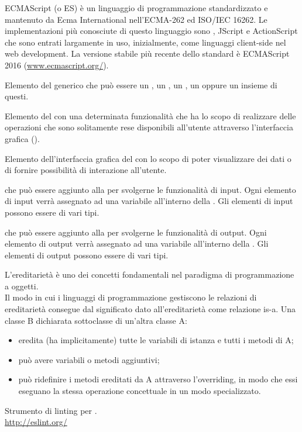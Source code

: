 ECMAScript (o ES) è un linguaggio di programmazione standardizzato e mantenuto da Ecma International nell'ECMA-262 ed ISO/IEC 16262. Le implementazioni più conosciute di questo linguaggio sono , JScript e ActionScript che sono entrati largamente in uso, inizialmente, come linguaggi client-side nel web development.
La versione stabile più recente dello standard è ECMAScript 2016 (\url{www.ecmascript.org/}).

Elemento del  generico che può essere un , un , un , un  oppure un insieme di questi.

Elemento del  con una determinata funzionalità che ha lo scopo di realizzare delle operazioni che sono solitamente rese disponibili all'utente attraverso l’interfaccia grafica ().

Elemento dell’interfaccia grafica del  con lo scopo di poter visualizzare dei dati o di fornire possibilità di interazione all’utente.

 che può essere aggiunto alla  per svolgerne le funzionalità di input. Ogni elemento di input verrà assegnato ad una variabile all’interno della . Gli elementi di input possono essere di vari tipi.

 che può essere aggiunto alla  per svolgerne le funzionalità di output. Ogni elemento di output verrà assegnato ad una variabile all’interno della . Gli elementi di output possono essere di vari tipi.

L'ereditarietà è uno dei concetti fondamentali nel paradigma di programmazione a oggetti.\\
Il modo in cui i linguaggi di programmazione gestiscono le relazioni di ereditarietà consegue dal significato dato all'ereditarietà come relazione is-a. Una classe B dichiarata sottoclasse di un'altra classe A:
\begin{itemize}
    \item eredita (ha implicitamente) tutte le variabili di istanza e tutti i metodi di A;
    \item può avere variabili o metodi aggiuntivi;
    \item può ridefinire i metodi ereditati da A attraverso l'overriding, in modo che essi eseguano la stessa operazione concettuale in un modo specializzato.
\end{itemize}

Strumento di linting per .\\
\url{http://eslint.org/}
\clearpage
